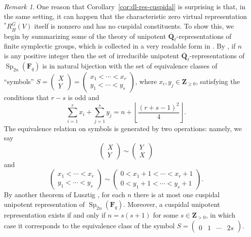\documentclass[reqno]{amsart}
\numberwithin{equation}{subsection}
\newcommand{\F}{\mathbf{F}}
\newcommand{\Q}{\mathbf{Q}}
\newcommand{\Z}{\mathbf{Z}}
\newcommand{\ol}[1]{\overline{#1}}
\DeclareMathOperator{\Sp}{Sp}
\theoremstyle{remark}
\newtheorem{remark}[thm]{Remark}
\numberwithin{equation}{subsection}
\numberwithin{figure}{subsection}
\begin{document}
\begin{remark}\label{remark:non-cuspidal-dl-restriction}
    One reason that Corollary~\ref{cor:dl-res-cuspidal} is surprising is that, in the same setting, it can happen that the characteristic zero virtual representation $^*R_{\ol H}^{\ol G}(V)$ itself is nonzero and has no cuspidal constituents. To show this, we begin by summarizing some of the theory of unipotent $\ol\Q_\ell$-representations of finite symplectic groups, which is collected in a very readable form in \cite[Chapter~4]{GM20}. By \cite[Theorem~4.4.13]{GM20}, if $n$ is any positive integer then the set of irreducible unipotent $\ol\Q_\ell$-representations of $\Sp_{2n}(\F_q)$ is in natural bijection with the set of equivalence classes of ``symbols'' $S = \begin{pmatrix} X \\ Y \end{pmatrix} = \begin{pmatrix} x_1 < \cdots < x_r \\ y_1 < \cdots < y_s\end{pmatrix}$, where $x_i, y_j \in \Z_{\geq 0}$, satisfying the conditions that $r - s$ is odd and
    \[
    \sum_{i=1}^r x_i + \sum_{j=1}^s y_j = n + \left\lfloor\frac{(r+s-1)^2}{4} \right\rfloor.
    \]
    The equivalence relation on symbols is generated by two operations: namely, we say 
    \[
    \begin{pmatrix} X \\ Y \end{pmatrix} \sim \begin{pmatrix} Y \\ X \end{pmatrix}
    \]
    and
    \[
    \begin{pmatrix} x_1 < \cdots < x_r \\ y_1 < \cdots < y_s \end{pmatrix} \sim \begin{pmatrix} 0 < x_1 + 1 < \cdots < x_r + 1 \\ 0 < y_1 + 1 < \cdots < y_s + 1 \end{pmatrix}.
    \]
    By another theorem of Lusztig \cite[Theorem~4.4.28]{GM20}, for each $n$ there is at most one cuspidal unipotent representation of $\Sp_{2n}(\F_q)$. Moreover, a cuspidal unipotent representation exists if and only if $n = s(s+1)$ for some $s \in \Z_{> 0}$, in which case it corresponds to the equivalence class of the symbol $S = \begin{pmatrix} \\ 0&1&\cdots&2s \end{pmatrix}$.


\end{remark}
\end{document}
